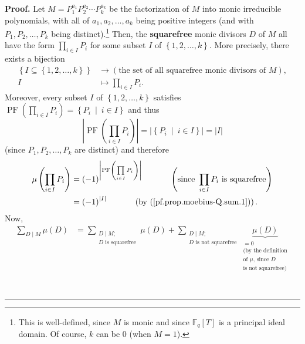 \documentclass[numbers=enddot,12pt,final,onecolumn,notitlepage]{scrartcl}%
\theoremstyle{definition}
\newenvironment{proof}[1][Proof]{\noindent\textbf{#1.} }{\ \rule{0.5em}{0.5em}}
\let\sumnonlimits\sum
\let\prodnonlimits\prod
\renewcommand{\sum}{\sumnonlimits\limits}
\renewcommand{\prod}{\prodnonlimits\limits}
\begin{document}
\begin{proof}
Let $M=P_{1}^{a_{1}}P_{2}^{a_{2}}\cdots P_{k}^{a_{k}}$ be the factorization of
$M$ into monic irreducible polynomials, with all of $a_{1},a_{2},\ldots,a_{k}$
being positive integers (and with $P_{1},P_{2},\ldots,P_{k}$ being
distinct).\footnote{This is well-defined, since $M$ is monic and since
$\mathbb{F}_{q}\left[  T\right]  $ is a principal ideal domain. Of course, $k$
can be $0$ (when $M=1$).} Then, the \textbf{squarefree} monic divisors $D$ of
$M$ all have the form $\prod_{i\in I}P_{i}$ for some subset $I$ of $\left\{
1,2,\ldots,k\right\}  $. More precisely, there exists a bijection%
\begin{align}
\left\{  I\subseteq\left\{  1,2,\ldots,k\right\}  \right\}   &  \rightarrow
\left(  \text{the set of all squarefree monic divisors of }M\right)
,\nonumber\\
I  &  \mapsto\prod_{i\in I}P_{i}. \label{pf.prop.moebius-Q.sum.bij}%
\end{align}
Moreover, every subset $I$ of $\left\{  1,2,\ldots,k\right\}  $ satisfies
$\operatorname*{PF}\left(  \prod_{i\in I}P_{i}\right)  =\left\{  P_{i}%
\ \mid\ i\in I\right\}  $ and thus%
\begin{equation}
\left\vert \operatorname*{PF}\left(  \prod_{i\in I}P_{i}\right)  \right\vert
=\left\vert \left\{  P_{i}\ \mid\ i\in I\right\}  \right\vert =\left\vert
I\right\vert \label{pf.prop.moebius-Q.sum.1}%
\end{equation}
(since $P_{1},P_{2},\ldots,P_{k}$ are distinct) and therefore
\begin{align}
\mu\left(  \prod_{i\in I}P_{i}\right)   &  =\left(  -1\right)  ^{\left\vert
\operatorname*{PF}\left(  \prod_{i\in I}P_{i}\right)  \right\vert
}\ \ \ \ \ \ \ \ \ \ \left(  \text{since }\prod_{i\in I}P_{i}\text{ is
squarefree}\right) \nonumber\\
&  =\left(  -1\right)  ^{\left\vert I\right\vert }\ \ \ \ \ \ \ \ \ \ \left(
\text{by (\ref{pf.prop.moebius-Q.sum.1})}\right)  .
\label{pf.prop.moebius-Q.sum.2}%
\end{align}
Now,%
\begin{align*}
\sum_{D\mid M}\mu\left(  D\right)   &  =\sum_{\substack{D\mid M;\\D\text{ is
squarefree}}}\mu\left(  D\right)  +\sum_{\substack{D\mid M;\\D\text{ is not
squarefree}}}\underbrace{\mu\left(  D\right)  }_{\substack{=0\\\text{(by the
definition}\\\text{of }\mu\text{, since }D\\\text{is not squarefree)}}}\\

\end{align*}
\end{proof}
\end{document}

